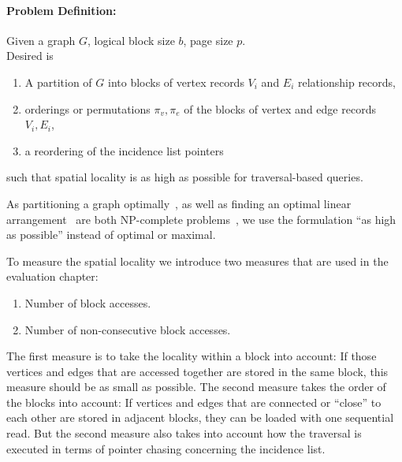     \paragraph{Problem Definition:} Given a graph $G$, logical block size $b$, page size $p$. \\
    Desired is 
    \begin{enumerate}
     \item A partition of $G$ into blocks of vertex records $V_i$ and $E_i$ relationship records, 
     \item orderings or permutations $\pi_v, \pi_e$ of the blocks of vertex and edge records $V_i, E_i$,
     \item a reordering of the incidence list pointers
    \end{enumerate}
    such that spatial locality is as high as possible for traversal-based queries.
    
    As partitioning a graph optimally~\autocite{andreev2006balanced}, as well as finding an optimal linear arrangement~\autocite{garey1974some} are both NP-complete problems~\autocite{lewis1983computers}, we use the formulation ``as high as possible'' instead of optimal or maximal.
    
    To measure the spatial locality we introduce two measures that are used in the evaluation chapter:
    \begin{enumerate}
     \item Number of block accesses.
     \item Number of non-consecutive block accesses.
    \end{enumerate}
    The first measure is to take the locality within a block into account:
    If those vertices and edges that are accessed together are stored in the same block, this measure should be as small as possible.
    The second measure takes the order of the blocks into account: 
    If vertices and edges that are connected or ``close'' to each other are stored in adjacent blocks, they can be loaded with one sequential read.
    But the second measure also takes into account how the traversal is executed in terms of pointer chasing concerning the incidence list.
    
